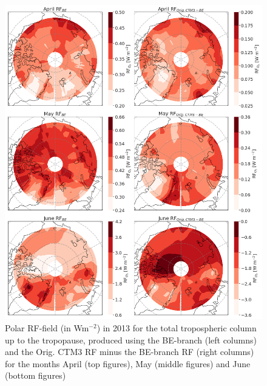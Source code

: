 \begin{figure}[ht]
    \centering
    \includegraphics[width = \linewidth]{Chapter6_Results/images/RF/RF_USE/BEOrig_RF_polar_AprJune_2013.png}
    \caption{Polar RF-field (in Wm$^{-2}$) in 2013 for the total tropospheric column up to the tropopause, produced using the BE-branch (left columns) and the Orig. CTM3 RF minus the BE-branch RF (right columns) for the months April (top figures), May (middle figures) and June (bottom figures)}
    \label{fig:BEorig_RF_polar_AprJune_2013}
\end{figure}